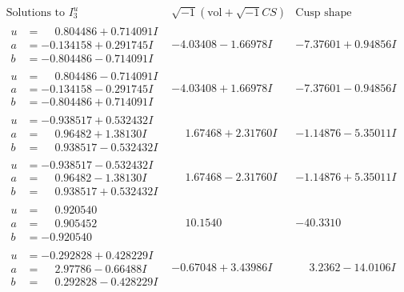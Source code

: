 \documentclass[1p]{elsarticle_modified}
\theoremstyle{definition}
\newcommand{\I}{\sqrt{-1}}
\begin{document}
$$\begin{array}{c|c|c}  
\text{Solutions to }I^u_{3}& \I (\text{vol} + \sqrt{-1}CS) & \text{Cusp shape}\\
 \hline 
\begin{aligned}
u &= \phantom{-}0.804486 + 0.714091 I \\
a &= -0.134158 + 0.291745 I \\
b &= -0.804486 - 0.714091 I\end{aligned}
 & -4.03408 - 1.66978 I & -7.37601 + 0.94856 I \\ \hline\begin{aligned}
u &= \phantom{-}0.804486 - 0.714091 I \\
a &= -0.134158 - 0.291745 I \\
b &= -0.804486 + 0.714091 I\end{aligned}
 & -4.03408 + 1.66978 I & -7.37601 - 0.94856 I \\ \hline\begin{aligned}
u &= -0.938517 + 0.532432 I \\
a &= \phantom{-}0.96482 + 1.38130 I \\
b &= \phantom{-}0.938517 - 0.532432 I\end{aligned}
 & \phantom{-}1.67468 + 2.31760 I & -1.14876 - 5.35011 I \\ \hline\begin{aligned}
u &= -0.938517 - 0.532432 I \\
a &= \phantom{-}0.96482 - 1.38130 I \\
b &= \phantom{-}0.938517 + 0.532432 I\end{aligned}
 & \phantom{-}1.67468 - 2.31760 I & -1.14876 + 5.35011 I \\ \hline\begin{aligned}
u &= \phantom{-}0.920540\phantom{ +0.000000I} \\
a &= \phantom{-}0.905452\phantom{ +0.000000I} \\
b &= -0.920540\phantom{ +0.000000I}\end{aligned}
 & \phantom{-}10.1540\phantom{ +0.000000I} & -40.3310\phantom{ +0.000000I} \\ \hline\begin{aligned}
u &= -0.292828 + 0.428229 I \\
a &= \phantom{-}2.97786 - 0.66488 I \\
b &= \phantom{-}0.292828 - 0.428229 I\end{aligned}
 & -0.67048 + 3.43986 I & \phantom{-}3.2362 - 14.0106 I \\ \hline\begin{aligned}

\end{aligned}
\end{array}$$
\end{document}
